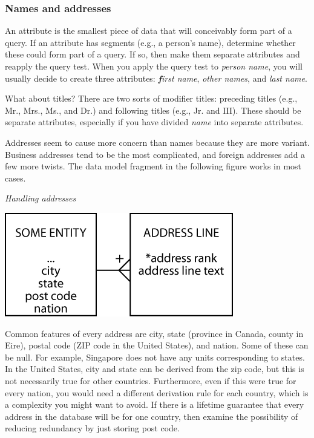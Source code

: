 \documentclass[
]{article}
\begin{document}
\hypertarget{names-and-addresses}{%
\subsubsection*{Names and addresses}\label{names-and-addresses}}

An attribute is the smallest piece of data that will conceivably form
part of a query. If an attribute has segments (e.g., a person's name),
determine whether these could form part of a query. If so, then make
them separate attributes and reapply the query test. When you apply the
query test to \emph{person name}, you will usually decide to create three
attributes: \emph{\textbf{f}irst name}, \emph{other names}, and \emph{last name}.

What about titles? There are two sorts of modifier titles: preceding
titles (e.g., Mr., Mrs., Ms., and Dr.) and following titles (e.g., Jr.
and III). These should be separate attributes, especially if you have
divided \emph{name} into separate attributes.

Addresses seem to cause more concern than names because they are more
variant. Business addresses tend to be the most complicated, and foreign
addresses add a few more twists. The data model fragment in the
following figure works in most cases.

\emph{Handling addresses}

\includegraphics{Figures/Chapter 7/address.png}

Common features of every address are city, state (province in Canada,
county in Eire), postal code (ZIP code in the United States), and
nation. Some of these can be null. For example, Singapore does not have
any units corresponding to states. In the United States, city and state
can be derived from the zip code, but this is not necessarily true for
other countries. Furthermore, even if this were true for every nation,
you would need a different derivation rule for each country, which is a
complexity you might want to avoid. If there is a lifetime guarantee
that every address in the database will be for one country, then examine
the possibility of reducing redundancy by just storing post code.
\end{document}
